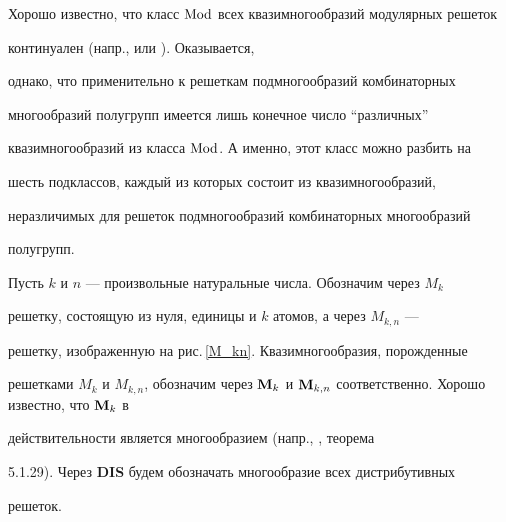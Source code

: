 Хорошо известно, что класс $\operatorname{Mod}$ всех квазимногообразий модулярных решеток


континуален (напр., \cite{Grat} или \cite{Gorb}). Оказывается,


однако, что применительно к решеткам подмногообразий комбинаторных


многообразий полугрупп имеется лишь конечное число ``различных''


квазимногообразий из класса $\operatorname{Mod}$. А именно, этот класс можно разбить на


шесть подклассов, каждый из которых состоит из квазимногообразий,


неразличимых для решеток подмногообразий комбинаторных многообразий


полугрупп. 





Пусть $k$ и $n$ --- произвольные натуральные числа. Обозначим через $M_k$


решетку, состоящую из нуля, единицы и $k$ атомов, а через $M_{k,n}$ ---


решетку, изображенную на рис.\,\ref{M_kn}. Квазимногообразия, порожденные


решетками $M_k$ и $M_{k,n}$, обозначим через $\bold M_k$ и $\bold


M_{k,n}$ соответственно. Хорошо известно, что $\bold M_k$ в


действительности является многообразием (напр., \cite{Gorb}, теорема


5.1.29). Через {\bf DIS} будем обозначать многообразие всех дистрибутивных


решеток.





